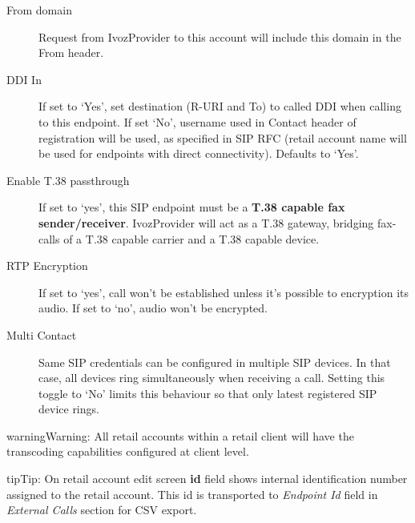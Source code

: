 \documentclass[letterpaper,10pt,english]{sphinxmanual}
\begin{document}
\begin{description}
\item[{From domain}] \leavevmode{}\label{administration_portal/client/retail/retail_accounts:term-from-domain}
Request from IvozProvider to this account will include this domain in
the From header.

\item[{DDI In}] \leavevmode{}\label{administration_portal/client/retail/retail_accounts:term-ddi-in}
If set to `Yes', set destination (R-URI and To) to called DDI when calling to this endpoint. If set `No', username
used in Contact header of registration will be used, as specified in SIP RFC (retail account name will be used for
endpoints with direct connectivity). Defaults to `Yes'.

\item[{Enable T.38 passthrough}] \leavevmode{}\label{administration_portal/client/retail/retail_accounts:term-enable-t-38-passthrough}
If set to `yes', this SIP endpoint must be a \textbf{T.38 capable fax sender/receiver}. IvozProvider
will act as a T.38 gateway, bridging fax-calls of a T.38 capable carrier and a T.38 capable device.

\item[{RTP Encryption}] \leavevmode{}\label{administration_portal/client/retail/retail_accounts:term-rtp-encryption}
If set to `yes', call won't be established unless it's possible to encryption its audio. If set to `no',
audio won't be encrypted.

\item[{Multi Contact}] \leavevmode{}\label{administration_portal/client/retail/retail_accounts:term-multi-contact}
Same SIP credentials can be configured in multiple SIP devices. In that case, all devices ring
simultaneously when receiving a call. Setting this toggle to `No' limits this behaviour so that
only latest registered SIP device rings.

\end{description}

\begin{notice}{warning}{Warning:}
All retail accounts within a retail client will have the transcoding capabilities configured at client level.
\end{notice}

\begin{notice}{tip}{Tip:}
On retail account edit screen \textbf{id} field shows internal identification number assigned to the retail account.
This id is transported to \emph{Endpoint Id} field in \emph{External Calls} section for CSV export.
\end{notice}
\end{document}
